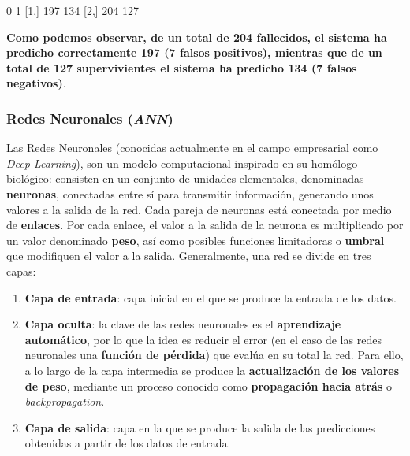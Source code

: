 \documentclass [a4paper] {article}
\begin{document}
\begin{Schunk}
\begin{Soutput}
       0   1
[1,] 197 134
[2,] 204 127
\end{Soutput}
\end{Schunk}

\textbf{Como podemos observar, de un total de 204 fallecidos, el sistema ha predicho correctamente 197 (7 falsos positivos), mientras que de un total de 127 supervivientes el sistema ha predicho 134 (7 falsos negativos)}.
\newpage

\subsubsection{Redes Neuronales (\textit{ANN})}
Las Redes Neuronales (conocidas actualmente en el campo empresarial como \textit{Deep Learning}), son un modelo computacional inspirado en su homólogo biológico: consisten en un conjunto de unidades elementales, denominadas \textbf{neuronas}, conectadas entre sí para transmitir información, generando unos valores a la salida de la red.
Cada pareja de neuronas está conectada por medio de \textbf{enlaces}. Por cada enlace, el valor a la salida de la neurona es multiplicado por un valor denominado \textbf{peso}, así como posibles funciones limitadoras o \textbf{umbral} que modifiquen el valor a la salida.
Generalmente, una red se divide en tres capas:
\begin{enumerate}
  \item \textbf{Capa de entrada}: capa inicial en el que se produce la entrada de los datos.
  \item \textbf{Capa oculta}: la clave de las redes neuronales es el \textbf{aprendizaje automático}, por lo que la idea es reducir el error (en el caso de las redes neuronales una \textbf{función de pérdida}) que evalúa en su total la red. Para ello, a lo largo de la capa intermedia se produce la \textbf{actualización de los valores de peso}, mediante un proceso conocido como \textbf{propagación hacia atrás} o \textit{backpropagation}.
  \item \textbf{Capa de salida}: capa en la que se produce la salida de las predicciones obtenidas a partir de los datos de entrada.
\end{enumerate}
\end{document}
